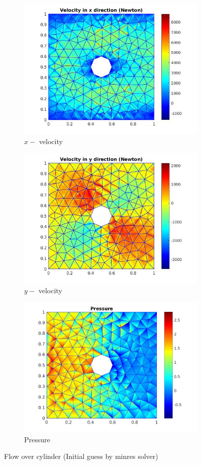 \documentclass[a4paper,twoside,openright]{book}
\begin{document}
\begin{figure}
  \begin{subfigure}{\textwidth}
    \includegraphics[width=0.8\linewidth]{cylinder_newton_vx_minres.jpg}
    \caption{$x-$ velocity}
  \label{x_vel_navier_stoke_minres}
  \end{subfigure}
  \begin{subfigure}{\textwidth}
    \includegraphics[width=0.8\linewidth]{cylinder_newton_vy_minres.jpg}
    \caption{$y-$ velocity}
  \label{y_vel_navier_stoke_minres}
  \end{subfigure}
  \begin{subfigure}{\textwidth}
    \includegraphics[width=0.8\linewidth]{cylinder_newton_pressure_minres.jpg}
    \caption{Pressure}
  \label{pressure_navier_stoke_minres}
  \end{subfigure}
\caption{Flow over cylinder (Initial guess by minres solver)}
\label{flow_over_cylinder_minres_n_s}
\end{figure}
\end{document}
